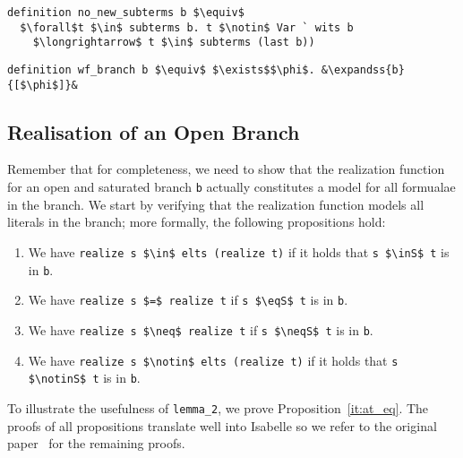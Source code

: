 \documentclass[sigplan,10pt,anonymous,review]{acmart}
\newcommand{\lefttriangle}{\mathrel{\tikz[baseline]{\draw (1ex, 0.75ex) -- (0, 1.25ex) -- (0, 0.25ex) -- cycle;}}}
\newcommand{\expandss}[2]{#1 $\lefttriangle^*$ #2}
\newcommand{\inS}{\in_\text{s}}
\newcommand{\notinS}{\notin_\text{s}}
\newcommand{\eqS}{=_\text{s}}
\newcommand{\neqS}{\neq_\text{s}}
\begin{document}
\begin{lstlisting}
definition no_new_subterms b $\equiv$
  $\forall$t $\in$ subterms b. t $\notin$ Var ` wits b
    $\longrightarrow$ t $\in$ subterms (last b))
\end{lstlisting}

\begin{lstlisting}
definition wf_branch b $\equiv$ $\exists$$\phi$. &\expandss{b}{[$\phi$]}&
\end{lstlisting}


\subsection{Realisation of an Open Branch}
Remember that for completeness, we need to show that the realization function for an open and saturated branch \lstinline!b! actually constitutes a model for all formualae in the branch.
We start by verifying that the realization function models all literals in the branch; more formally, the following propositions hold: 
\begin{enumerate}[label=(\roman*)]
  \item\label{it:at_mem} We have \lstinline!realize s $\in$ elts (realize t)! if it holds that \lstinline!s $\inS$ t! is in \lstinline!b!. 
  \item\label{it:at_eq} We have \lstinline!realize s $=$ realize t! if \lstinline!s $\eqS$ t! is in \lstinline!b!.
  \item\label{it:af_eq} We have \lstinline!realize s $\neq$ realize t! if \lstinline!s $\neqS$ t! is in \lstinline!b!.
  \item\label{it:af_mem} We have \lstinline!realize s $\notin$ elts (realize t)! if it holds that \lstinline!s $\notinS$ t! is in \lstinline!b!. 
\end{enumerate}
To illustrate the usefulness of \lstinline!lemma_2!, we prove Proposition~\ref{it:at_eq}.
The proofs of all propositions translate well into Isabelle so we refer to the original paper~\cite{new_fast_tableau} for the remaining proofs. 
\end{document}
